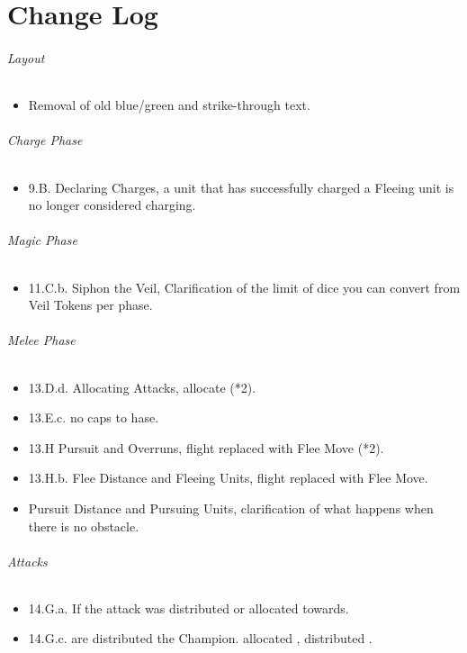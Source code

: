 \part{Change Log}
\label{change_log}

\paragraph{Layout}
\begin{itemize}[label={-}]
\item Removal of old blue/green and strike-through text.
\end{itemize}

\paragraph{Charge Phase}
\begin{itemize}[label={-}]
\item 9.B. Declaring Charges, a unit that has successfully charged a Fleeing unit is no longer considered charging.
\end{itemize}

\paragraph{Magic Phase}
\begin{itemize}[label={-}]
\item 11.C.b. Siphon the Veil, Clarification of the limit of dice you can convert from Veil Tokens per phase.
\end{itemize}

\paragraph{Melee Phase}
\begin{itemize}[label={-}]
\item 13.D.d. Allocating Attacks, allocate  (*2).
\item 13.E.c. no caps to hase.
\item 13.H Pursuit and Overruns, flight replaced with Flee Move (*2).
\item 13.H.b. Flee Distance and Fleeing Units, flight replaced with Flee Move.
\item Pursuit Distance and Pursuing Units, clarification of what happens when there is no obstacle.
\end{itemize}

\paragraph{Attacks}
\begin{itemize}[label={-}]
\item 14.G.a. If the attack was distributed  or allocated towards.
\item 14.G.c. are distributed  the Champion. allocated , distributed .
\end{itemize}

